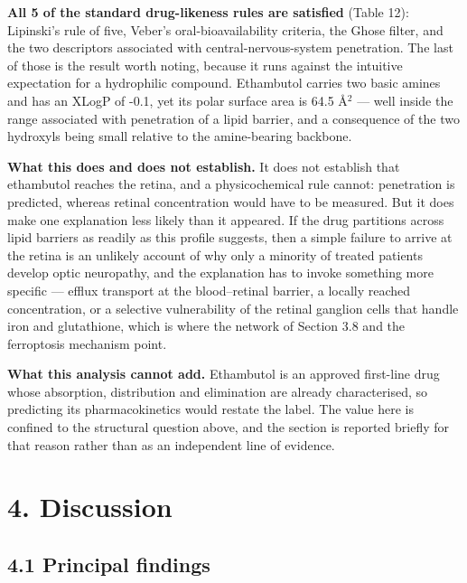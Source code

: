 \documentclass[utf8]{FrontiersinVancouver}
\begin{document}
\textbf{All 5 of the standard drug-likeness rules are satisfied} (Table 12): Lipinski's rule of five, Veber's oral-bioavailability criteria, the Ghose filter, and the two descriptors associated with central-nervous-system penetration. The last of those is the result worth noting, because it runs against the intuitive expectation for a hydrophilic compound. Ethambutol carries two basic amines and has an XLogP of -0.1, yet its polar surface area is 64.5 \AA{}$^{2}$ --- well inside the range associated with penetration of a lipid barrier, and a consequence of the two hydroxyls being small relative to the amine-bearing backbone.

\textbf{What this does and does not establish.} It does not establish that ethambutol reaches the retina, and a physicochemical rule cannot: penetration is predicted, whereas retinal concentration would have to be measured. But it does make one explanation less likely than it appeared. If the drug partitions across lipid barriers as readily as this profile suggests, then a simple failure to arrive at the retina is an unlikely account of why only a minority of treated patients develop optic neuropathy, and the explanation has to invoke something more specific --- efflux transport at the blood--retinal barrier, a locally reached concentration, or a selective vulnerability of the retinal ganglion cells that handle iron and glutathione, which is where the network of Section 3.8 and the ferroptosis mechanism point.

\textbf{What this analysis cannot add.} Ethambutol is an approved first-line drug whose absorption, distribution and elimination are already characterised, so predicting its pharmacokinetics would restate the label. The value here is confined to the structural question above, and the section is reported briefly for that reason rather than as an independent line of evidence.

\section{4. Discussion}

\subsection{4.1 Principal findings}
\end{document}

